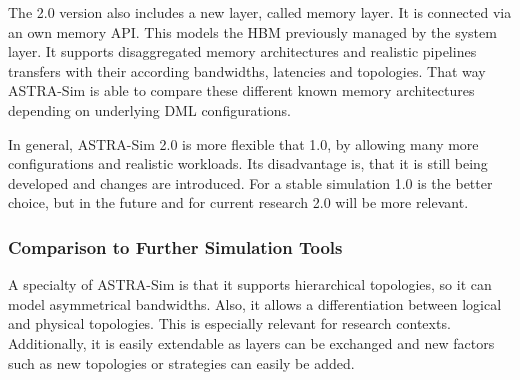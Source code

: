 The 2.0 version also includes a new layer, called memory layer. It is connected via an own memory \ac{API}. This models the \ac{HBM} previously managed by the system layer. It supports disaggregated memory architectures and realistic pipelines transfers with their according bandwidths, latencies and topologies. That way \ac{ASTRA-Sim} is able to compare these different known memory architectures depending on underlying \ac{DML} configurations.

In general, \ac{ASTRA-Sim} 2.0 is more flexible that 1.0, by allowing many more configurations and realistic workloads. Its disadvantage is, that it is still being developed and changes are introduced. For a stable simulation 1.0 is the better choice, but in the future and for current research 2.0 will be more relevant.


\subsubsection*{Comparison to Further Simulation Tools}

A specialty of \ac{ASTRA-Sim} is that it supports hierarchical topologies, so it can model asymmetrical bandwidths. Also, it allows a differentiation between logical and physical topologies. This is especially relevant for research contexts.
Additionally, it is easily extendable as layers can be exchanged and new factors such as new topologies or strategies can easily be added.






